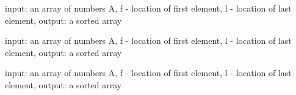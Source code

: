 \documentclass{article}
\begin{document}
\begin{algorithm}[h!]
    \begin{algorithmic}[1]
         {input:  an array of numbers A, f - location of first element, l - location of last element, output: a sorted array}
            \EndIf

        \EndFunction{}
    \end{algorithmic}
\end{algorithm}





\begin{algorithm}[h!]
    \begin{algorithmic}[1]
         {input:  an array of numbers A, f - location of first element, l - location of last element, output: a sorted array}
                \EndIf 
            \EndWhile
        \EndFunction{}
    \end{algorithmic}
\end{algorithm}






\begin{algorithm}[h!]
    \begin{algorithmic}[1]
         {input:  an array of numbers A, f - location of first element, l - location of last element, output: a sorted array}

                \EndWhile

                \EndWhile

                \Else
                \EndIf
            \EndWhile

            \State{} 

        \EndFunction{}
    \end{algorithmic}
\end{algorithm}
\end{document}
